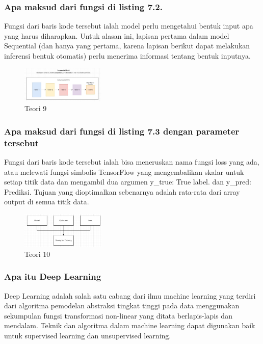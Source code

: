 \subsubsection{Apa maksud dari fungsi di listing 7.2.}
\hfill\break

Fungsi dari baris kode tersebut ialah model perlu mengetahui bentuk input apa yang harus diharapkan. Untuk alasan ini, lapisan pertama dalam model Sequential (dan hanya yang pertama, karena lapisan berikut dapat melakukan inferensi bentuk otomatis) perlu menerima informasi tentang bentuk inputnya.
\begin{figure}[H]
\centering
	\includegraphics[width=4cm]{figures/1174066/7/9.jpg}
\caption{Teori 9}
\end{figure}

\subsubsection{Apa maksud dari fungsi di listing 7.3 dengan parameter tersebut}
\hfill\break

Fungsi dari baris kode tersebut ialah bisa meneruskan nama fungsi loss yang ada, atau melewati fungsi simbolis TensorFlow yang mengembalikan skalar untuk setiap titik data dan mengambil dua argumen y\_true: True label. dan  y\_pred: Prediksi. Tujuan yang dioptimalkan sebenarnya adalah rata-rata dari array output di semua titik data.
\begin{figure}[H]
\centering
	\includegraphics[width=4cm]{figures/1174066/7/10.jpg}
\caption{Teori 10}
\end{figure}

\subsubsection{Apa itu Deep Learning}
\hfill\break
Deep Learning adalah salah satu cabang dari ilmu machine learning yang terdiri dari algoritma pemodelan abstraksi tingkat tinggi pada data menggunakan sekumpulan fungsi transformasi non-linear yang ditata berlapis-lapis dan mendalam. Teknik dan algoritma dalam machine learning dapat digunakan baik untuk supervised learning dan unsupervised learning.

